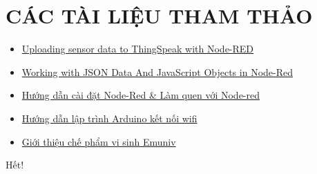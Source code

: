 \documentclass[12pt, a4paper]{article}
\begin{document}
\section{CÁC TÀI LIỆU THAM THẢO}
\begin{itemize}
    \item \href{https://www.iqhome.org/uploading-sensor-data-to-thingspeak-with-node-red}{Uploading sensor data to ThingSpeak with Node-RED}
    \item \href{https://stevesnoderedguide.com/working-with-json-data-node-red}{Working with JSON Data And JavaScript Objects in Node-Red}
    \item \href{https://www.youtube.com/watch?v=p74GGc5CZoc}{Hướng dẫn cài đặt Node-Red \& Làm quen với Node-red}
    \item \href{https://ohstem.vn/lp-courses/lap-trinh-arduino/lap-trinh-arduino-phan-ket-noi-wifi/}{Hướng dẫn lập trình Arduino kết nối wifi}
    \item \href{https://www.emuniv.com/products/che-pham-vi-sinh-vat-huu-hieu}{Giới thiệu chế phẩm vi sinh Emuniv}
\end{itemize}
\vspace{100pt}

\begin{center}
    \Large{Hết!}
\end{center}
\end{document}
